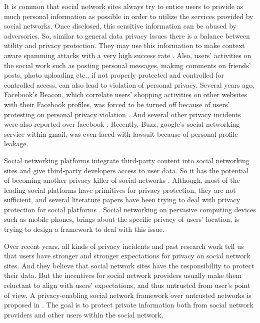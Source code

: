 \documentclass[12pt]{article}
\begin{document}
It is common that social network sites always try to entice users to
provide as much personal information as possible\cite{linkedin} in
order to utilize the services provided by social networks. Once
disclosed, this sensitive information can be abused by
adversories. So, similar to general data privacy issues there is a
balance between utility and privacy protection. They may use this
information to make context aware spamming\cite{context-aware-spam}
attacks with a very high success rate \cite{social-phishing}. Also,
users' activities on the social work such as posting personal
messages, making comments on friends' posts, photo uploading etc., if
not properly protected and controlled for controlled access, can also
lead to violation of personal privacy. Several years ago, Facebook's
Beacon, which correlate users' shopping activities on other websites
with their Facebook profiles, was forced to be turned off because of
users' protesting on personal privacy violation
\cite{facebook-turnoff-beacon}. And several other privacy incidents
were also reported over facebook
\cite{social-networking-report-economist}. Recently, Buzz, google's
social networking service within gmail, was even faced with lawsuit
because of personal profile leakage\cite{google-buzz-lawsuit}.

Social networking platforms integrate third-party content into social
networking sites and give third-party developers access to user
data. So it has the potential of becoming another privacy killer of
social networks \cite{privacy-social-platform}. Although, most of the
leading social platforms have primitives for privacy protection, they
are not sufficient, and several literature papers have been trying to
deal with privacy protection for social platforms
\cite{privacy-fundamental-construct} \cite{xbook-social-platform}
\cite{privacy-social-platform} \cite{secure-social-app-framework}
\cite{user-privacy-social-app}. Social networking on pervasive computing
devices such as mobile phones, brings about the specific privacy of
users' location, \cite{privacy-mobile-SN} is trying to design a
framework to deal with this issue.  

Over recent years, all kinds of privacy incidents and past research
work tell us that users have stronger and stronger expectations
for privacy on social network sites. And they believe that social
network sites have the responsibility to protect their
data\cite{privacy-social-platform}. But the incentives for social
network providers usually make them reluctant to align with users'
expectations, and thus untrusted from user's point of view. A
privacy-enabling social network framework over untrusted networks is
proposed in \cite{privacy-SN-untrusted-networks}. The goal is to
protect private information both from social network providers and
other users within the social network. 
\end{document}
